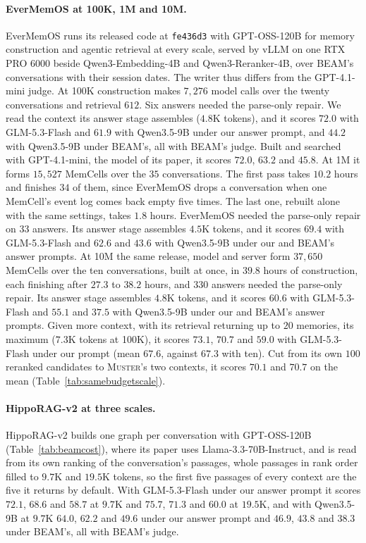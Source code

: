 \documentclass{article}
\newcommand{\sys}{\textsc{Muster}}
\begin{document}
\paragraph{EverMemOS at 100K, 1M and 10M.} EverMemOS runs its released code at \texttt{fe436d3} with GPT-OSS-120B for memory construction and agentic retrieval at every scale, served by vLLM on one RTX PRO 6000 beside Qwen3-Embedding-4B and Qwen3-Reranker-4B, over BEAM's conversations with their session dates. The writer thus differs from the GPT-4.1-mini judge. At 100K construction makes $7{,}276$ model calls over the twenty conversations and retrieval $612$. Six answers needed the parse-only repair. We read the context its answer stage assembles ($4.8$K tokens), and it scores $72.0$ with GLM-5.3-Flash and $61.9$ with Qwen3.5-9B under our answer prompt, and $44.2$ with Qwen3.5-9B under BEAM's, all with BEAM's judge. Built and searched with GPT-4.1-mini, the model of its paper, it scores $72.0$, $63.2$ and $45.8$. At 1M it forms $15{,}527$ MemCells over the $35$ conversations. The first pass takes $10.2$ hours and finishes $34$ of them, since EverMemOS drops a conversation when one MemCell's event log comes back empty five times. The last one, rebuilt alone with the same settings, takes $1.8$ hours. EverMemOS needed the parse-only repair on $33$ answers. Its answer stage assembles $4.5$K tokens, and it scores $69.4$ with GLM-5.3-Flash and $62.6$ and $43.6$ with Qwen3.5-9B under our and BEAM's answer prompts. At 10M the same release, model and server form $37{,}650$ MemCells over the ten conversations, built at once, in $39.8$ hours of construction, each finishing after $27.3$ to $38.2$ hours, and $330$ answers needed the parse-only repair. Its answer stage assembles $4.8$K tokens, and it scores $60.6$ with GLM-5.3-Flash and $55.1$ and $37.5$ with Qwen3.5-9B under our and BEAM's answer prompts. Given more context, with its retrieval returning up to $20$ memories, its maximum ($7.3$K tokens at 100K), it scores $73.1$, $70.7$ and $59.0$ with GLM-5.3-Flash under our prompt (mean $67.6$, against $67.3$ with ten). Cut from its own $100$ reranked candidates to \sys{}'s two contexts, it scores $70.1$ and $70.7$ on the mean (Table~\ref{tab:samebudgetscale}).

\paragraph{HippoRAG-v2 at three scales.} HippoRAG-v2 builds one graph per conversation with GPT-OSS-120B (Table~\ref{tab:beamcost}), where its paper uses Llama-3.3-70B-Instruct, and is read from its own ranking of the conversation's passages, whole passages in rank order filled to $9.7$K and $19.5$K tokens, so the first five passages of every context are the five it returns by default. With GLM-5.3-Flash under our answer prompt it scores $72.1$, $68.6$ and $58.7$ at $9.7$K and $75.7$, $71.3$ and $60.0$ at $19.5$K, and with Qwen3.5-9B at $9.7$K $64.0$, $62.2$ and $49.6$ under our answer prompt and $46.9$, $43.8$ and $38.3$ under BEAM's, all with BEAM's judge.
\end{document}
